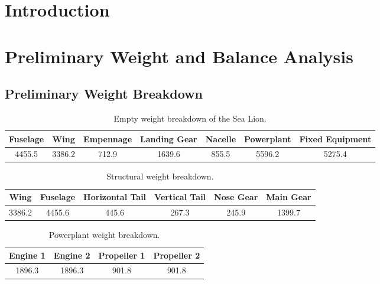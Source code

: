 \documentclass[conf]{new-aiaa}
\begin{document}
\section{Introduction}

\section{Preliminary Weight and Balance Analysis}

\subsection{Preliminary Weight Breakdown}

\begin{table}
\label{tab:Empty Weight}
\caption{Empty weight breakdown of the Sea Lion.}
\begin{tabular}{|c|c|c|c|c|c|c|}\hline
Fuselage & Wing & Empennage & Landing Gear & Nacelle & Powerplant & Fixed Equipment \\ \hline
4455.5 & 3386.2 & 712.9 & 1639.6 & 855.5 & 5596.2 & 5275.4 \\ \hline
\end{tabular}
\end{table}
\begin{table}
\label{tab:Structural Weight}
\caption{Structural weight breakdown.}
\begin{tabular}{|c|c|c|c|c|c|}
Wing & Fuselage & Horizontal Tail & Vertical Tail & Nose Gear & Main Gear \\ \hline
3386.2 & 4455.6 & 445.6 & 267.3 & 245.9 & 1399.7 \\ \hline
\end{tabular}
\end{table}

\begin{table}
\label{tab:Powerplant Weight}
\caption{Powerplant weight breakdown.}
\begin{tabular}{|c|c|c|c|}
Engine 1 & Engine 2 & Propeller 1 & Propeller 2 \\ \hline
1896.3 & 1896.3 & 901.8 & 901.8 \\ \hline
\end{tabular}
\end{table}
\end{document}
